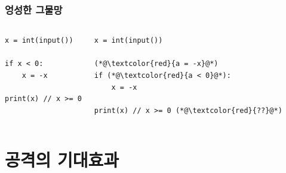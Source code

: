 \documentclass{simplesnt}
\begin{document}
\begin{frame}[c, fragile]
  \frametitle{엉성한 그물망}

  \setlength{\columnsep}{10pt}

  \begin{columns}[c]
    \vspace*{\fill}

    \centering %
    \hfill
    \begin{minipage}{0.9\linewidth} %
    \begin{lstlisting}
x = int(input())

if x < 0:
    x = -x

print(x) // x >= 0
    \end{lstlisting}
    \end{minipage}

    \vspace*{\fill}

    \vspace*{\fill}

    \hspace*{\fill}
    \centering %
    \hfill
    \begin{minipage}{0.9\linewidth} %
    \begin{lstlisting}
x = int(input())

(*@\textcolor{red}{a = -x}@*)
if (*@\textcolor{red}{a < 0}@*):
    x = -x

print(x) // x >= 0 (*@\textcolor{red}{??}@*)
    \end{lstlisting}
    \end{minipage}
    \vspace*{\fill}
  \end{columns}

\end{frame}




\section{공격의 기대효과}
\end{document}
